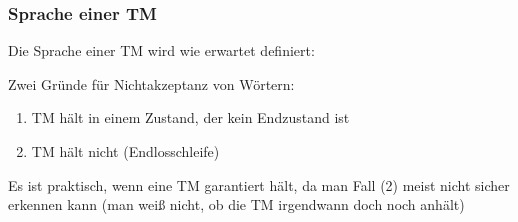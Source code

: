 \documentclass[onlymath]{beamer}
\begin{document}
\begin{frame}\frametitle{Sprache einer TM}

Die Sprache einer TM wird wie erwartet definiert:

\pause

Zwei Gründe für Nichtakzeptanz von Wörtern:
\begin{enumerate}[(1)]
\item TM hält in einem Zustand, der kein Endzustand ist
\item TM hält nicht (Endlosschleife)
\end{enumerate}
Es ist praktisch, wenn eine TM garantiert hält, da man Fall (2) meist nicht sicher erkennen kann (man weiß nicht, ob die TM irgendwann doch noch anhält)


\end{frame}
\end{document}
